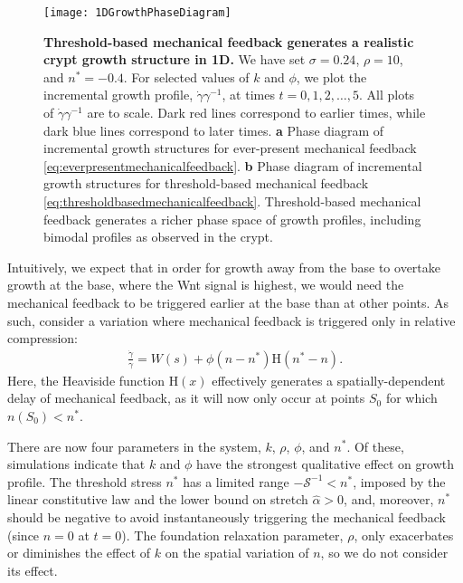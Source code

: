 \begin{figure*}[t]
	\centering
	\texttt{[image: 1DGrowthPhaseDiagram]}
	\caption{\textbf{Threshold-based mechanical feedback generates a realistic crypt growth structure in 1D.} We have set $\sigma = 0.24$, $\rho = 10$, and $n^* = -0.4$. For selected values of $k$ and $\phi$, we plot the incremental growth profile, $\dot{\gamma}\gamma^{-1}$, at times $t = 0, 1, 2, \dots, 5$. All plots of $\dot{\gamma}\gamma^{-1}$ are to scale. Dark red lines correspond to earlier times, while dark blue lines correspond to later times. \textbf{a} Phase diagram of incremental growth structures for ever-present mechanical feedback \eqref{eq:everpresentmechanicalfeedback}. \textbf{b} Phase diagram of incremental growth structures for threshold-based mechanical feedback \eqref{eq:thresholdbasedmechanicalfeedback}. Threshold-based mechanical feedback generates a richer phase space of growth profiles, including bimodal profiles as observed in the crypt.}
	\label{fig:1Dgrowthphasediagrams}
\end{figure*}

Intuitively, we expect that in order for growth away from the base to overtake growth at the base, where the Wnt signal is highest, we would need the mechanical feedback to be triggered earlier at the base than at other points.
As such, consider a variation where mechanical feedback is triggered only in relative compression:
\begin{align}
\frac{\dot{\gamma}}{\gamma} = W(s) + \phi(n - n^*)\mathrm{H}(n^* - n).\label{eq:thresholdbasedmechanicalfeedback}
\end{align}
Here, the Heaviside function $\mathrm{H}(x)$ effectively generates a spatially-dependent delay of mechanical feedback, as it will now only occur at points $S_0$ for which $n(S_0) < n^*$. 

There are now four parameters in the system, $k$, $\rho$, $\phi$, and $n^*$. Of these, simulations indicate that $k$ and $\phi$ have the strongest qualitative effect on growth profile. The threshold stress $n^*$ has a limited range $-\mathcal{S}^{-1} < n^*$, imposed by the linear constitutive law and the lower bound on stretch $\hat\alpha>0$, and, moreover, $n^*$ should be negative to avoid instantaneously triggering the mechanical feedback (since $n=0$ at $t=0$). The foundation relaxation parameter, $\rho$, only exacerbates or diminishes the effect of $k$ on the spatial variation of $n$, so we do not consider its effect.


